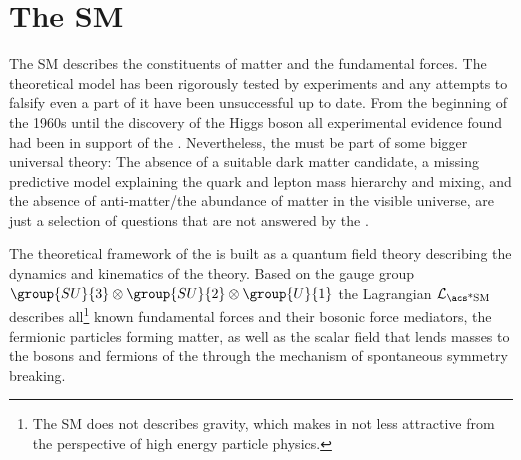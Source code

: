 
\section{The \acl*{SM}}
\label{sec:cpv_theory:standard_model}

The \acf{SM} describes the constituents of matter and the fundamental forces.
The theoretical model has been rigorously tested by experiments and any attempts
to falsify even a part of it have been unsuccessful up to date. From the
beginning of the 1960s until the discovery of the Higgs boson \cite{Aad:2015zhl}
all experimental evidence found had been in support of the \SM. Nevertheless,
the \SM must be part of some bigger universal theory: The absence of a suitable
dark matter candidate, a missing predictive model explaining the quark and
lepton mass hierarchy and mixing, and the absence of anti-matter/the abundance
of matter in the visible universe, are just a selection of questions that are
not answered by the \SM.

The theoretical framework of the \SM is built as a quantum field theory
describing the dynamics and kinematics of the theory. Based on the gauge group
$\group{SU}{3}\otimes\group{SU}{2}\otimes\group{U}{1}$ the \SM Lagrangian
$\mathcal{L}_{\text{\acs*{SM}}}$ describes all\footnote{The \ac{SM} does not
describes gravity, which makes in not less attractive from the perspective of
high energy particle physics.} known fundamental forces and their bosonic force
mediators, the fermionic particles forming matter, as well as the scalar field
that lends masses to the bosons and fermions of the \SM through the mechanism of
spontaneous symmetry breaking.

